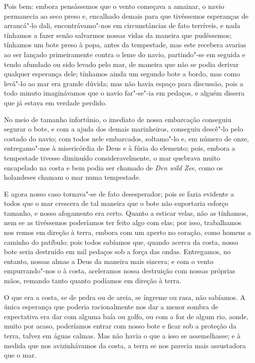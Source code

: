 Pois bem: embora pensássemos que o vento começava a amainar, o navio
permanecia ao seco preso e, encalhado demais para que tivéssemos
esperanças de arrancá"-lo dali, encontrávamo"-nos em circunstâncias de
fato terríveis, e nada tínhamos a fazer senão salvarmos nossas vidas da
maneira que pudéssemos; tínhamos um bote preso à popa, antes da
tempestade, mas este recebera avarias ao ser lançado primeiramente
contra o leme do navio, partindo"-se em seguida e tendo afundado ou sido
levado pelo mar, de maneira que não se podia derivar qualquer esperança
dele; tínhamos ainda um segundo bote a bordo, mas como levá"-lo ao mar
era grande dúvida; mas não havia espaço para discussão, pois a todo
minuto imaginávamos que o navio far"-se"-ia em pedaços, e alguém dissera
que já estava em verdade perdido.

No meio de tamanho infortúnio, o imediato de nossa embarcação conseguiu
segurar o bote, e com a ajuda dos demais marinheiros, conseguiu descê"-lo
pelo costado do navio; com todos nele embarcados, soltamo"-lo e, em
número de onze, entregamo"-nos à misericórdia de Deus e à fúria do
elemento; pois, embora a tempestade tivesse diminuído consideravelmente,
o mar quebrava muito encapelado na costa e bem podia ser chamado de
\emph{Den wild Zee}, como os holandeses chamam o mar numa tempestade.

E agora nosso caso tornava"-se de fato desesperador; pois se fazia
evidente a todos que o mar crescera de tal maneira que o bote não
suportaria esforço tamanho, e nosso afogamento era certo. Quanto a
esticar velas, não as tínhamos, nem se as tivéssemos poderíamos ter
feito algo com elas; por isso, trabalhamos nos remos em direção à terra,
embora com um aperto no coração, como homens a caminho do patíbulo; pois
todos sabíamos que, quando acerca da costa, nosso bote seria destruído
em mil pedaços sob a força das ondas. Entregamos, no entanto, nossas
almas a Deus da maneira mais sincera; e com o vento empurrando"-nos o à
costa, aceleramos nossa destruição com nossas próprias mãos, remando
tanto quanto podíamos em direção à terra.

O que era a costa, se de pedra ou de areia, se íngreme ou rasa, não
sabíamos. A única esperança que poderia racionalmente nos dar a menor
sombra de expectativa era dar com alguma baía ou golfo, ou com a foz de
algum rio, aonde, muito por acaso, poderíamos entrar com nosso bote e
ficar sob a proteção da terra, talvez em águas calmas. Mas não havia o
que a isso se assemelhasse; e à medida que nos avizinhávamos da costa, a
terra se nos parecia mais assustadora que o mar.

